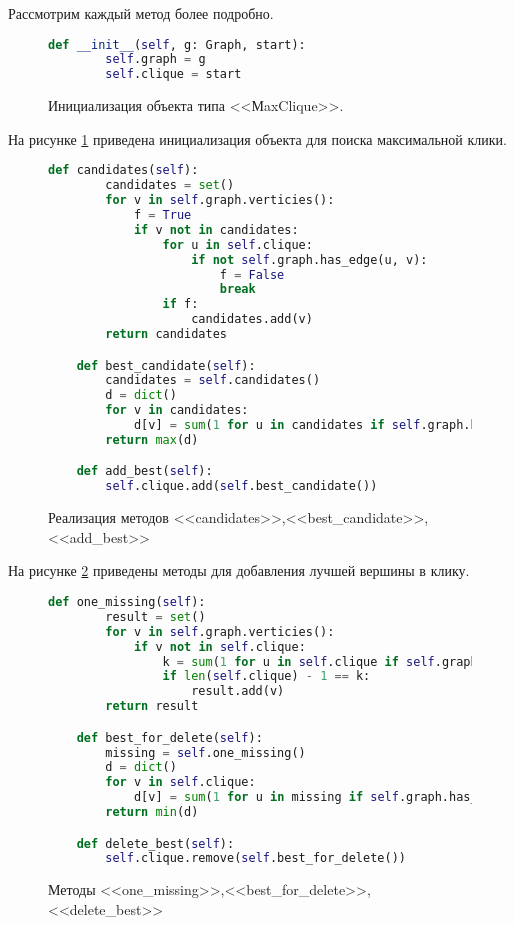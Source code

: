 Рассмотрим каждый метод более подробно. 
\begin{figure}[H] 
\begin{lstlisting}[language=Python] 
    def __init__(self, g: Graph, start):
        self.graph = g
        self.clique = start
\end{lstlisting}  
    \caption{Инициализация объекта типа <<МaxClique>>.}
    \label{mxcl_1}
\end{figure} 
На рисунке \ref{mxcl_1} приведена инициализация объекта для поиска
максимальной клики.
\begin{figure}[H] 
\begin{lstlisting}[language=Python] 
    def candidates(self):
        candidates = set()
        for v in self.graph.verticies():
            f = True
            if v not in candidates:
                for u in self.clique:
                    if not self.graph.has_edge(u, v):
                        f = False
                        break
                if f:
                    candidates.add(v)
        return candidates

    def best_candidate(self):
        candidates = self.candidates()
        d = dict()
        for v in candidates:
            d[v] = sum(1 for u in candidates if self.graph.has_edge(u, v))
        return max(d)

    def add_best(self):
        self.clique.add(self.best_candidate())
\end{lstlisting}  
    \caption{Реализация методов <<candidates>>,<<best\_candidate>>,<<add\_best>>}
    \label{mxcl_2}
\end{figure} 
На рисунке \ref{mxcl_2} приведены методы для добавления лучшей вершины в клику.
\begin{figure}[H] 
\begin{lstlisting}[language=Python] 
    def one_missing(self):
        result = set()
        for v in self.graph.verticies():
            if v not in self.clique:
                k = sum(1 for u in self.clique if self.graph.has_edge(u, v))
                if len(self.clique) - 1 == k:
                    result.add(v)
        return result

    def best_for_delete(self):
        missing = self.one_missing()
        d = dict()
        for v in self.clique:
            d[v] = sum(1 for u in missing if self.graph.has_edge(v, u))
        return min(d)

    def delete_best(self):
        self.clique.remove(self.best_for_delete())
\end{lstlisting}  
    \caption{Методы <<one\_missing>>,<<best\_for\_delete>>,<<delete\_best>>}
    \label{mxcl_4}
\end{figure} 
